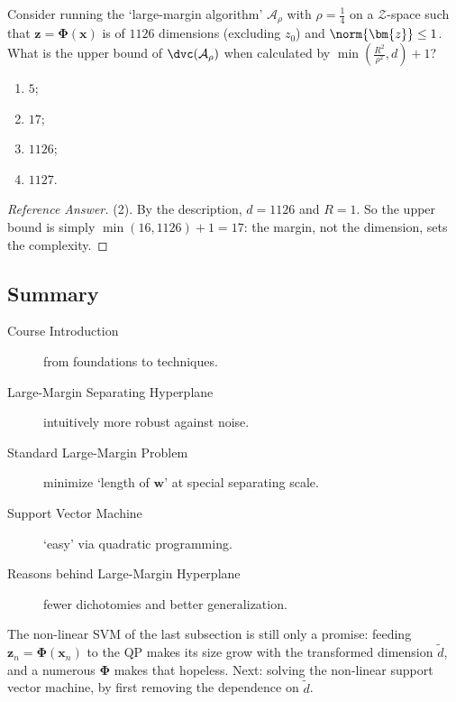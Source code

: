 \begin{exercise}
    Consider running the `large-margin algorithm' \(\mathcal{A}_\rho\) with
    \(\rho = \frac{1}{4}\) on a \(\mathcal{Z}\)-space such that \(\bm{z} =
    \bm{\Phi}(\bm{x})\) is of \(1126\) dimensions (excluding \(z_0\)) and
    \(\norm{\bm{z}} \le 1\). What is the upper bound of
    \(\dvc(\mathcal{A}_\rho)\) when calculated by \(\min \left(
    \frac{R^2}{\rho^2}, d \right) + 1\)?
    \begin{enumerate}[(1)]
        \item \(5\);
        \item \(17\);
        \item \(1126\);
        \item \(1127\).
    \end{enumerate}
\end{exercise}

\begin{proof}[Reference Answer]
    (2). By the description, \(d = 1126\) and \(R = 1\). So the upper bound
    is simply \(\min(16, 1126) + 1 = 17\): the margin, not the dimension,
    sets the complexity.
\end{proof}

\hrulebar

\subsection*{Summary}

\begin{description}
    \item[Course Introduction] from foundations to techniques.
    \item[Large-Margin Separating Hyperplane] intuitively more robust against
        noise.
    \item[Standard Large-Margin Problem] minimize `length of \(\bm{w}\)' at
        special separating scale.
    \item[Support Vector Machine] `easy' via quadratic programming.
    \item[Reasons behind Large-Margin Hyperplane] fewer dichotomies and
        better generalization.
\end{description}

The non-linear SVM of the last subsection is still only a promise: feeding
\(\bm{z}_n = \bm{\Phi}(\bm{x}_n)\) to the QP makes its size grow with the
transformed dimension \(\tilde{d}\), and a numerous \(\bm{\Phi}\) makes that
hopeless. Next: solving the non-linear support vector machine, by first
removing the dependence on \(\tilde{d}\).
